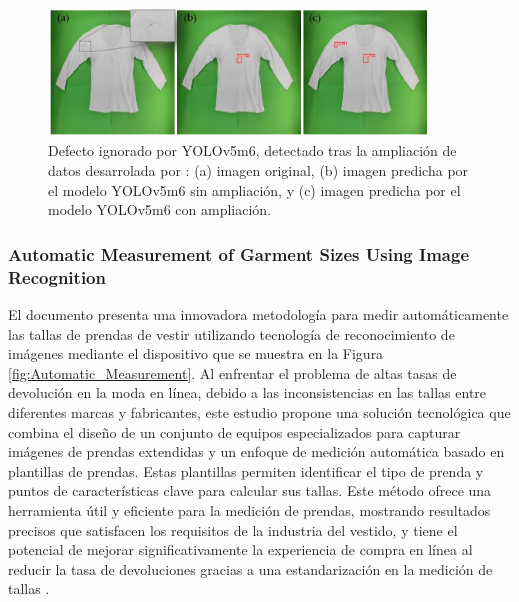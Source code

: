 \begin{figure}[H]
	\centering
	\includegraphics[width=0.9\textwidth]{img/example_YOLO.pdf}
	\caption[Defecto ignorado por YOLOv5m6, detectado tras la ampliación de datos.]{Defecto ignorado por YOLOv5m6, detectado tras la ampliación de datos desarrolada por \cite{Rocha2023}: (a) imagen original, (b) imagen predicha por el modelo YOLOv5m6 sin ampliación, y (c) imagen predicha por el modelo YOLOv5m6 con ampliación.}
	\label{fig:example_YOLO}
\end{figure}

\subsubsection{Automatic Measurement of Garment Sizes Using Image Recognition}

El documento presenta una innovadora metodología para medir automáticamente las tallas de prendas de vestir utilizando tecnología de reconocimiento de imágenes mediante el dispositivo que se muestra en la Figura \ref{fig:Automatic_Measurement}. Al enfrentar el problema de altas tasas de devolución en la moda en línea, debido a las inconsistencias en las tallas entre diferentes marcas y fabricantes, este estudio propone una solución tecnológica que combina el diseño de un conjunto de equipos especializados para capturar imágenes de prendas extendidas y un enfoque de medición automática basado en plantillas de prendas. Estas plantillas permiten identificar el tipo de prenda y puntos de características clave para calcular sus tallas. Este método ofrece una herramienta útil y eficiente para la medición de prendas, mostrando resultados precisos que satisfacen los requisitos de la industria del vestido, y tiene el potencial de mejorar significativamente la experiencia de compra en línea al reducir la tasa de devoluciones gracias a una estandarización en la medición de tallas \cite{Li2017AutomaticMeasurement}.

